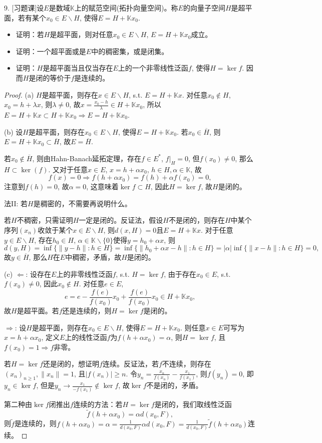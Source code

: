 \documentclass[a4paper,8pt]{ctexart}\textwidth 140mm \textheight 216mm
\newcommand{\8}{\infty}
\newcommand{\RA}{\Rightarrow}
\newcommand{\LA}{\Leftarrow}
\begin{document}
9. [习题课]设$E$是数域$\mathbb{K}$上的赋范空间(拓扑向量空间)。称$E$的向量子空间$H$是超平面，若有某个$x_0\in E\backslash H$, 使得$E=H+\mathbb{K}x_0$.
\begin{itemize}
	\item[(a)] 证明：若$H$是超平面，则对任意$x_0\in E\backslash H$, $E=H+\mathbb{K}x_0$成立。
	\item[(b)] 证明：一个超平面或是$E$中的稠密集，或是闭集。
	\item[(c)] 证明：$H$是超平面当且仅当存在$E$上的一个非零线性泛函$f$, 使得$H=\ker f$. 因而$H$是闭的等价于$f$是连续的。
\end{itemize}
\begin{proof}
	(a) $H$是超平面，则存在$x\in E\backslash H$, s.t. $E=H+\mathbb{K}x$. 对任意$x_0\notin H$, $x_0=h+\lambda x$, 则$\lambda\ne 0$, 故$x=\frac{x_0-h}{\lambda}\in H+\mathbb{K}x_0$, 所以$E=H+\mathbb{K}x\subset H+\mathbb{K}x_0\RA E=H+\mathbb{K}x_0$.
	
	(b) 设$H$是超平面，则存在$x_0\in E\backslash H$, 使得$E=H+\mathbb{K}x_0$. 若$x_0\in\overline{H}$, 则$E=H+\mathbb{K}x_0\subset \overline{H}$, 
	故$E=\overline{H}$. 
	
	若$x_0\notin \overline{H}$, 则由Hahn-Banach延拓定理，存在$f\in E^*$, $f|_H=0$, 但$f(x_0)\ne 0$, 那么$H\subset \ker(f)$. 又对于任意$x\in E$, $x=h+\alpha x_0$, $h\in H, \alpha\in \mathbb{K}$, 故
	$$f(x)=0\RA f(h+\alpha x_0)=f(h)+\alpha f(x_0)=0,$$ 注意到$f(h)=0$, 故$\alpha=0$, 这意味着$\ker f\subset H$, 因此$H=\ker f$, 故$H$是闭的。
	
	法II: 若$H$是稠密的，不需要再说明什么。
	
	若$H$不稠密，只需证明$H$一定是闭的。反证法，假设$H$不是闭的，则存在$H$中某个序列$(x_n)$收敛于某个$x\in E\backslash H$, 则$d(x,H)=0$且$E=H+\mathbb{K}x$. 对于任意$y\in E\backslash H$, 存在$h_0\in H$, $\alpha\in \mathbb{K}\backslash \{0\}$使得$y=h_0+\alpha x$, 则 \[d(y,H)=\inf \{\|y-h\|: h\in H\}=\inf \{\|h_0+\alpha x-h\|: h\in H\}=|\alpha|\inf \{\|x-h\|: h\in H\}=0,\]
	故$y\in \overline{H}$, 那么$H$在$E$中稠密，矛盾，故$H$是闭的。
	
	(c) $\LA$: 设存在$E$上的非零线性泛函$f$, s.t. $H=\ker f$, 由于存在$x_0\in E$, s.t.$f(x_0)\ne 0$, 因此$x_0\notin H$. 对任意$e\in E$, $$e=e-\frac{f(e)}{f(x_0)}x_0+\frac{f(e)}{f(x_0)}x_0\in H+\mathbb{K}x_0,$$
	故$H$是超平面。若$f$还是连续的，则$H=\ker f$是闭的。
	
	$\RA$: 设$H$是超平面，则存在$x_0\in E\backslash H$, 使得$E=H+\mathbb{K}x_0$. 则任意$x\in E$可写为$x=h+\alpha x_0$, 定义$E$上的线性泛函$f$为$f(h+\alpha x_0)=\alpha$, 则$H=\ker f$, 且$f(x_0)=1\RA f$非零。
	
	若$H=\ker f$还是闭的，想证明$f$连续。反证法，若$f$不连续，则存在$(x_n)_{n\geq 1},\|x_n\|=1$, 且$|f(x_n)|\geq n$. 令$y_n=\frac{x_n}{f(x_n)}-\frac{x_1}{f(x_1)}$, 则$f(y_n)=0$, 即$y_n\in \ker f$, 但是$y_n\to\frac{x_1}{-f(x_1)}\notin\ker f$, 故$\ker f$不是闭的，矛盾。
	
	第二种由$\ker f$闭推出$f$连续的方法：若$H=\ker f$是闭的，我们取线性泛函
	$$\tilde{f}(h+\alpha x_0)=\alpha d(x_0,F),$$ 则$\tilde{f}$是连续的，则$f(h+\alpha x_0)=\alpha=\frac{1}{d(x_0,F)}\alpha d(x_0,F)=\frac{1}{d(x_0,F)}\tilde{f}(h+\alpha x_0)$连续。
\end{proof}
\end{document}
